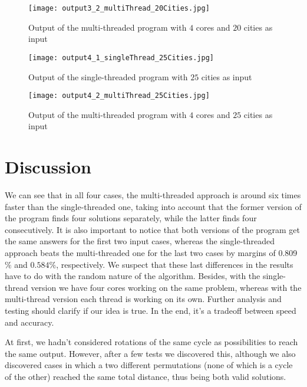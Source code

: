 \documentclass[twoside,twocolumn]{article}
\begin{document}
\begin{figure}[H]
\centering
\texttt{[image: output3\_2\_multiThread\_20Cities.jpg]}
\caption{Output of the multi-threaded program with $4$ cores and $20$ cities as input}
\end{figure} 

\begin{figure}[H]
\centering
\texttt{[image: output4\_1\_singleThread\_25Cities.jpg]}
\caption{Output of the single-threaded program with $25$ cities as input}
\end{figure} 

\begin{figure}[H]
\centering
\texttt{[image: output4\_2\_multiThread\_25Cities.jpg]}
\caption{Output of the multi-threaded program with $4$ cores and $25$ cities as input}
\end{figure} 
  
  
\section{Discussion}
  
We can see that in all four cases, the multi-threaded approach is around six times faster than the single-threaded one, taking into account that the former version of the program finds four solutions separately, while the latter finds four consecutively. It is also important to notice that both versions of the program get the same answers for the first two input cases, whereas the single-threaded approach beats the multi-threaded one for the last two cases by margins of 0.809$\%$ and $0.584\%$, respectively. We suspect that these last differences in the results have to do with the random nature of the algorithm. Besides, with the single-thread version we have four cores working on the same problem, whereas with the multi-thread version each thread is working on its own. Further analysis and testing should clarify if our idea is true. In the end, it's a tradeoff between speed and accuracy.\linebreak

At first, we hadn't considered rotations of the same cycle as possibilities to reach the same output. However, after a few tests we discovered this, although we also discovered cases in which a two different permutations (none of which is a cycle of the other) reached the same total distance, thus being both valid solutions.
  
\end{document}
